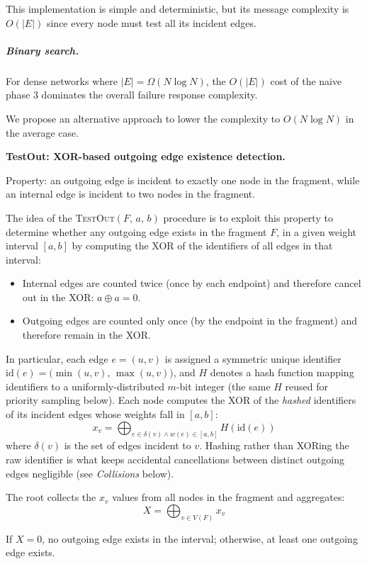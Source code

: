 This implementation is simple and deterministic, but its message complexity is $O(|E|)$
since every node must test all its incident edges.

\subparagraph{Binary search.\cite{king2015constructionimprompturepairmst}}

For dense networks where $|E| = \Omega(N\log N)$, the $O(|E|)$ cost of the naive phase 3
dominates the overall failure response complexity.

We propose an alternative approach to lower the complexity to $O(N\log N)$ in the average
case.
\smallskip

\noindent\textbf{TestOut: XOR-based outgoing edge existence detection.}

Property: an outgoing edge is incident to exactly one node in the fragment, while an
internal edge is incident to two nodes in the fragment.

The idea of the \textsc{TestOut}$(F,\,a,\,b)$ procedure is to exploit this property to
determine whether any outgoing edge exists in the fragment $F$, in a given weight interval
$[a,b]$ by computing the XOR of the identifiers of all edges in that interval:
\begin{itemize}
\item Internal edges are counted twice (once by each endpoint) and therefore cancel out in
the XOR: $a \oplus a = 0$.
\item Outgoing edges are counted only once (by the endpoint in the fragment) and therefore
remain in the XOR.
\end{itemize}

In particular, each edge $e = (u,v)$ is assigned a symmetric unique identifier
$\mathrm{id}(e) = \bigl(\min(u,v),\,\max(u,v)\bigr)$, and $H$ denotes a hash function
mapping identifiers to a uniformly-distributed $m$-bit integer (the same $H$ reused for
priority sampling below). Each node computes the XOR of the \emph{hashed} identifiers of
its incident edges whose weights fall in $[a,b]$:
$$
x_v = \bigoplus_{e \in \delta(v) \land w(e) \in [a,b]} H(\mathrm{id}(e))
$$
where $\delta(v)$ is the set of edges incident to $v$. Hashing rather than XORing the raw
identifier is what keeps accidental cancellations between distinct outgoing edges
negligible (see \emph{Collisions} below).

The root collects the $x_v$ values from all nodes in the fragment and aggregates:
$$
X = \bigoplus_{v \in V(F)} x_v
$$

If $X = 0$, no outgoing edge exists in the interval; otherwise, at least one outgoing edge
exists.


